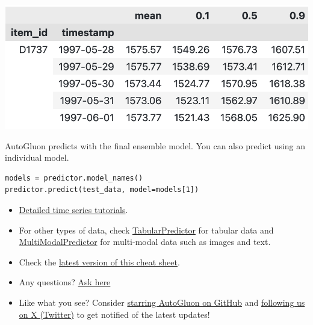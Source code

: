 \begin{center}
\includegraphics[width=0.6\linewidth]{timeseries/images/predictions.png}
\end{center}

\medskip

AutoGluon predicts with the final ensemble model. You can also predict using an individual model. 

\begin{verbatim}
models = predictor.model_names()
predictor.predict(test_data, model=models[1])
\end{verbatim}




\begin{itemize}
  \item \href{https://auto.gluon.ai/stable/tutorials/timeseries/index.html}{Detailed  time series tutorials}.
  \item For other types of data, check
  \href{https://auto.gluon.ai/stable/tutorials/tabular/index.html}{TabularPredictor} for tabular data and 
  \href{https://auto.gluon.ai/stable/tutorials/multimodal/index.html}{MultiModalPredictor} for multi-modal data such as images and text. 
  \item Check the \href{https://auto.gluon.ai/stable/cheatsheet.html}{latest version of this cheat sheet}.
  \item Any questions? \href{https://github.com/autogluon/autogluon/discussions}{Ask here}
  \item Like what you see? Consider \href{https://github.com/autogluon/autogluon/stargazers}{starring AutoGluon on GitHub} and \href{https://twitter.com/autogluon}{following us on X (Twitter)} to get notified of the latest updates!
\end{itemize}


\raggedcolumns


